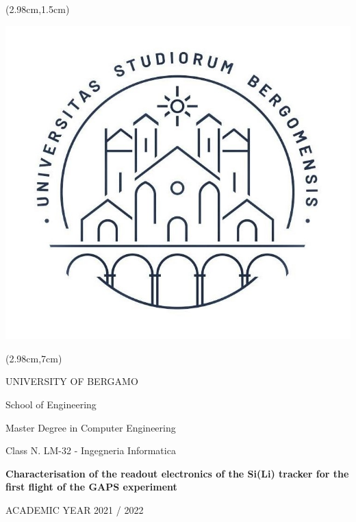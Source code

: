 \thispagestyle{empty}
\begin{textblock*}{\textwidth}(2.98cm,1.5cm)
    \begin{center}
        \includegraphics[scale=0.4]{Images/logo_unibg.jpg}  
    \end{center}
\end{textblock*}

\begin{textblock*}{\textwidth}(2.98cm,7cm)
    \begin{center}
        \large
        UNIVERSITY OF BERGAMO
    \end{center}
    \begin{center}
        School of Engineering
    \end{center}
    \vspace{-0.6cm}
    \begin{center}
        Master Degree in Computer Engineering
    \end{center}
    \vspace{-0.6cm}
    \begin{center}
        Class N. LM-32 - Ingegneria Informatica
    \end{center}
    \vspace{1cm}
    \begin{center}
        \LARGE
        \textbf{Characterisation of the readout electronics of the Si(Li) tracker for the first flight of the GAPS experiment}
    \end{center}
    \vspace{10.5cm}
    \begin{center}
         ACADEMIC YEAR 2021 / 2022
    \end{center}
\end{textblock*}

